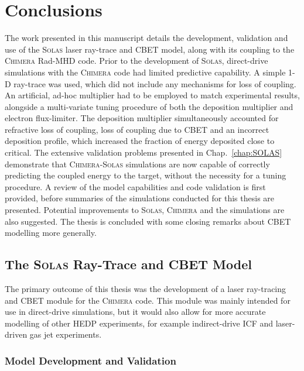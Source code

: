 \chapter{Conclusions}%
\label{chap:conclusions}

The work presented in this manuscript details the development, validation and use of the \textsc{Solas} laser ray-trace and \ac{CBET} model, along with its coupling to the \textsc{Chimera} \ac{Rad-MHD} code.
Prior to the development of \textsc{Solas}, direct-drive simulations with the \textsc{Chimera} code had limited predictive capability.
A simple 1-D ray-trace was used, which did not include any mechanisms for loss of coupling.
An artificial, ad-hoc multiplier had to be employed to match experimental results, alongside a multi-variate tuning procedure of both the deposition multiplier and electron flux-limiter.
The deposition multiplier simultaneously accounted for refractive loss of coupling, loss of coupling due to \ac{CBET} and an incorrect deposition profile, which increased the fraction of energy deposited close to critical.
The extensive validation problems presented in Chap.~\ref{chap:SOLAS} demonstrate that \textsc{Chimera}-\textsc{Solas} simulations are now capable of correctly predicting the coupled energy to the target, without the necessity for a tuning procedure.
A review of the model capabilities and code validation is first provided, before summaries of the simulations conducted for this thesis are presented.
Potential improvements to \textsc{Solas}, \textsc{Chimera} and the simulations are also suggested.
The thesis is concluded with some closing remarks about \ac{CBET} modelling more generally.

\newpage

\section{The \textsc{Solas} Ray-Trace and CBET Model}

The primary outcome of this thesis was the development of a laser ray-tracing and \ac{CBET} module for the \textsc{Chimera} code.
This module was mainly intended for use in direct-drive simulations, but it would also allow for more accurate modelling of other \ac{HEDP} experiments, for example indirect-drive \ac{ICF} and laser-driven gas jet experiments.

\subsection{Model Development and Validation}

